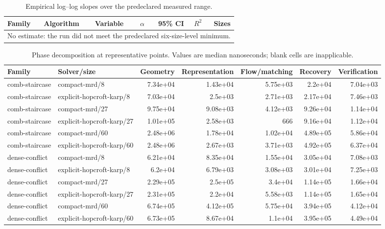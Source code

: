\begin{table}[t]
\caption{Empirical log--log slopes over the predeclared measured range.}
\label{tab:paper-scaling-exponents}
\begin{tabular}{lllrrrr}
\toprule
Family & Algorithm & Variable & $\alpha$ & 95\% CI & $R^2$ & Sizes \\
\midrule
\multicolumn{7}{l}{No estimate: the run did not meet the predeclared six-size-level minimum.} \\
\bottomrule
\end{tabular}
\end{table}

\begin{table}[t]
\caption{Phase decomposition at representative points. Values are median nanoseconds; blank cells are inapplicable.}
\label{tab:paper-scaling-phases}
\begin{tabular}{llrrrrr}
\toprule
Family & Solver/size & Geometry & Representation & Flow/matching & Recovery & Verification \\
\midrule
comb-staircase & compact-mrd/8 & 7.34e+04 & 1.43e+04 & 5.75e+03 & 2.2e+04 & 7.04e+03 \\
comb-staircase & explicit-hopcroft-karp/8 & 7.03e+04 & 2.5e+03 & 2.71e+03 & 2.17e+04 & 7.46e+03 \\
comb-staircase & compact-mrd/27 & 9.75e+04 & 9.08e+03 & 4.12e+03 & 9.26e+04 & 1.14e+04 \\
comb-staircase & explicit-hopcroft-karp/27 & 1.01e+05 & 2.58e+03 & 666 & 9.16e+04 & 1.12e+04 \\
comb-staircase & compact-mrd/60 & 2.48e+06 & 1.78e+04 & 1.02e+04 & 4.89e+05 & 5.86e+04 \\
comb-staircase & explicit-hopcroft-karp/60 & 2.48e+06 & 2.67e+03 & 3.71e+03 & 4.92e+05 & 6.37e+04 \\
dense-conflict & compact-mrd/8 & 6.21e+04 & 8.35e+04 & 1.55e+04 & 3.05e+04 & 7.08e+03 \\
dense-conflict & explicit-hopcroft-karp/8 & 6.2e+04 & 6.79e+03 & 3.08e+03 & 3.01e+04 & 7.25e+03 \\
dense-conflict & compact-mrd/27 & 2.29e+05 & 2.5e+05 & 3.4e+04 & 1.14e+05 & 1.66e+04 \\
dense-conflict & explicit-hopcroft-karp/27 & 2.31e+05 & 2.2e+04 & 5.58e+03 & 1.14e+05 & 1.65e+04 \\
dense-conflict & compact-mrd/60 & 6.74e+05 & 4.12e+05 & 5.75e+04 & 3.94e+05 & 4.12e+04 \\
dense-conflict & explicit-hopcroft-karp/60 & 6.73e+05 & 8.67e+04 & 1.1e+04 & 3.95e+05 & 4.49e+04 \\

\end{tabular}
\end{table}
